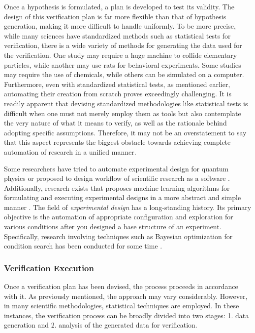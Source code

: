 \documentclass{book}
\begin{document}
Once a hypothesis is formulated, a plan is developed to test its validity. The design of this verification plan is far more flexible than that of hypothesis generation, making it more difficult to handle uniformly. To be more precise, while many sciences have standardized methods such as statistical tests for verification, there is a wide variety of methods for generating the data used for the verification. One study may require a huge machine to collide elementary particles, while another may use rats for behavioral experiments. Some studies may require the use of chemicals, while others can be simulated on a computer. Furthermore, even with standardized statistical tests, as mentioned earlier, automating their creation from scratch proves exceedingly challenging. It is readily apparent that devising standardized methodologies like statistical tests is difficult when one must not merely employ them as tools but also contemplate the very nature of what it means to verify, as well as the rationale behind adopting specific assumptions. Therefore, it may not be an overstatement to say that this aspect represents the biggest obstacle towards achieving complete automation of research in a unified manner.

Some researchers have tried to automate experimental design for quantum physics \cite{ruiz2022digital} or proposed to design workflow of scientific research as a software \cite{goble2020fair}. Additionally, research exists that proposes machine learning algorithms for formulating and executing experimental designs in a more abstract and simple manner \cite{herrmann2022learning}. The field of \textit{experimental design} has a long-standing history. Its primary objective is the automation of appropriate configuration and exploration for various conditions after you designed a base structure of an experiment. Specifically, research involving techniques such as Bayesian optimization for condition search has been conducted for some time \cite{chaloner1995bayesian,shahriari2015taking}.

\subsubsection{Verification Execution}

Once a verification plan has been devised, the process proceeds in accordance with it. As previously mentioned, the approach may vary considerably. However, in many scientific methodologies, statistical techniques are employed. In these instances, the verification process can be broadly divided into two stages: 1. data generation and 2. analysis of the generated data for verification.
\end{document}
